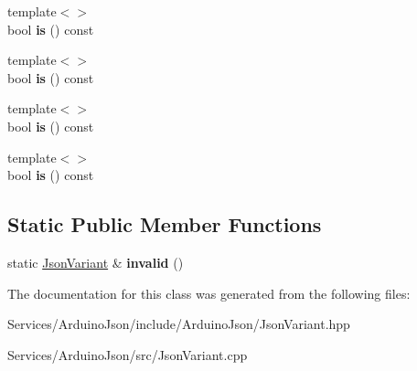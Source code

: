 \begin{DoxyCompactItemize}
\item 
\hypertarget{class_arduino_json_1_1_json_variant_a4c7167a72efd02a254688616634ebf55}{}{\footnotesize template$<$$>$ }\\bool {\bfseries is} () const \label{class_arduino_json_1_1_json_variant_a4c7167a72efd02a254688616634ebf55}

\item 
\hypertarget{class_arduino_json_1_1_json_variant_a4c7167a72efd02a254688616634ebf55}{}{\footnotesize template$<$$>$ }\\bool {\bfseries is} () const \label{class_arduino_json_1_1_json_variant_a4c7167a72efd02a254688616634ebf55}

\item 
\hypertarget{class_arduino_json_1_1_json_variant_a4c7167a72efd02a254688616634ebf55}{}{\footnotesize template$<$$>$ }\\bool {\bfseries is} () const \label{class_arduino_json_1_1_json_variant_a4c7167a72efd02a254688616634ebf55}

\item 
\hypertarget{class_arduino_json_1_1_json_variant_a4c7167a72efd02a254688616634ebf55}{}{\footnotesize template$<$$>$ }\\bool {\bfseries is} () const \label{class_arduino_json_1_1_json_variant_a4c7167a72efd02a254688616634ebf55}

\end{DoxyCompactItemize}
\subsection*{Static Public Member Functions}
\begin{DoxyCompactItemize}
\item 
\hypertarget{class_arduino_json_1_1_json_variant_a92704bcc018c798575a3432fd3cfb1bb}{}static \hyperlink{class_arduino_json_1_1_json_variant}{Json\+Variant} \& {\bfseries invalid} ()\label{class_arduino_json_1_1_json_variant_a92704bcc018c798575a3432fd3cfb1bb}

\end{DoxyCompactItemize}


The documentation for this class was generated from the following files\+:\begin{DoxyCompactItemize}
\item 
Services/\+Arduino\+Json/include/\+Arduino\+Json/Json\+Variant.\+hpp\item 
Services/\+Arduino\+Json/src/Json\+Variant.\+cpp\end{DoxyCompactItemize}
